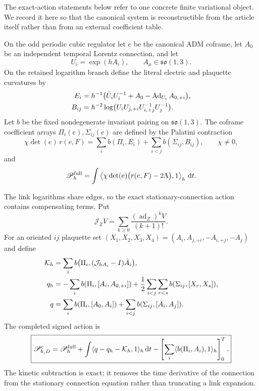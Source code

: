 \documentclass[11pt]{article}
\numberwithin{equation}{section}
\theoremstyle{definition}
\theoremstyle{remark}
\newcommand{\dd}{\mathrm d}
\begin{document}
The exact-action statements below refer to one concrete finite variational
object.  We record it here so that the canonical system is reconstructible
from the article itself rather than from an external coefficient table.

On the odd periodic cubic regulator let $e$ be the canonical ADM coframe,
let $A_0$ be an independent temporal Lorentz connection, and let
\begin{equation}
 U_i=\exp(hA_i),\qquad A_\mu\in\mathfrak{so}(1,3).
 \label{eq:supp-exact-links}
\end{equation}
On the retained logarithm branch define the literal electric and plaquette
curvatures by
\begin{align}
 E_i&=h^{-1}\bigl(\dot U_iU_i^{-1}+A_0
               -\operatorname{Ad}_{U_i}A_{0,+i}\bigr),\notag\\
 B_{ij}&=h^{-2}\log
 \bigl(U_iU_{j,+i}U_{i,+j}^{-1}U_j^{-1}\bigr).
 \label{eq:supp-exact-link-curvatures}
\end{align}
Let $b$ be the fixed nondegenerate invariant pairing on
$\mathfrak{so}(1,3)$.  The coframe coefficient arrays
$\Pi_i(e),\Sigma_{ij}(e)$ are defined by the Palatini contraction
\begin{equation}
 \chi\det(e)\,r(e,F)
 =\sum_i b(\Pi_i,E_i)+\sum_{i<j}b(\Sigma_{ij},B_{ij}),
 \qquad \chi\ne0,
 \label{eq:supp-exact-PiSigma}
\end{equation}
and
\begin{equation}
 \mathscr P_h^{\rm full}
 =\int\left\langle\chi\det(e)\bigl(r(e,F)-2\Lambda\bigr),1
       \right\rangle_h\,\dd t .
 \label{eq:supp-exact-full-palatini}
\end{equation}

The link logarithms share edges, so the exact stationary-connection action
contains compensating terms.  Put
\begin{equation}
 \mathcal J_ZV=\sum_{k\ge0}\frac{(\operatorname{ad}_Z)^kV}{(k+1)!}.
 \label{eq:supp-exact-J}
\end{equation}
For an oriented $ij$ plaquette set
$(X_1,X_2,X_3,X_4)=(A_i,A_{j,+i},-A_{i,+j},-A_j)$ and define
\begin{align}
 \mathcal K_h
 &=\sum_i b\bigl(\Pi_i,(\mathcal J_{hA_i}-I)\dot A_i\bigr),\notag\\
 q_h
 &=-\sum_i b(\Pi_i,[A_i,A_{0,+i}])
   +\frac12\sum_{i<j}\sum_{r<s}b(\Sigma_{ij},[X_r,X_s]),\notag\\
 q
 &=\sum_i b(\Pi_i,[A_0,A_i])
   +\sum_{i<j}b(\Sigma_{ij},[A_i,A_j]).
 \label{eq:supp-exact-compensators}
\end{align}
The completed signed action is
\begin{equation}
 \boxed{
 \mathscr P_{h,D}^{\rm c}
 =\mathscr P_h^{\rm full}
 +\int\langle q-q_h-\mathcal K_h,1\rangle_h\,\dd t
 -\left[\sum_i\langle b(\Pi_i,A_i),1\rangle_h\right]_0^T .}
 \label{eq:supp-exact-completed-action}
\end{equation}
The kinetic subtraction is exact; it removes the time derivative of the
connection from the stationary connection equation rather than truncating a
link expansion.
\end{document}
